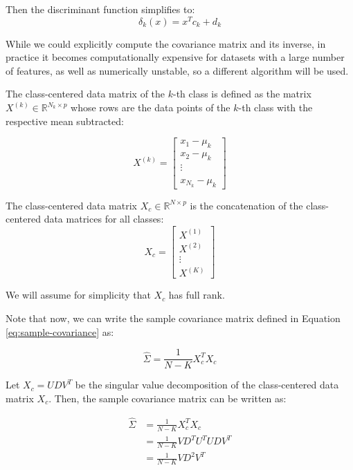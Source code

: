 Then the discriminant function simplifies to:
\[
\delta_k(x) = x^T c_k + d_k
\]

While we could explicitly compute the covariance matrix and its inverse, in practice it becomes computationally expensive for datasets with a large number of features, as well as numerically unstable, so a different algorithm will be used.

\begin{definition}
The class-centered data matrix of the $k$-th class is defined as the matrix $X^{(k)} \in \mathbb{R}^{N_{k} \times p}$ whose rows are the data points of the $k$-th class with the respective mean subtracted:

$$
X^{(k)} = \begin{bmatrix}
x_{1} - \mu_{k} \\
x_{2} - \mu_{k}  \\
\vdots \\  \\
x_{N_{k}} - \mu_{k}
\end{bmatrix}
$$
\end{definition}

\begin{definition}
The class-centered data matrix $X_c \in \mathbb{R}^{N \times p}$ is the concatenation of the class-centered data matrices for all classes:
\[
X_c = \begin{bmatrix}
X^{(1)} \\ X^{(2)} \\ \vdots \\ X^{(K)}
\end{bmatrix}
\]
\end{definition}

We will assume for simplicity that $X_c$ has full rank.

Note that now, we can write the sample covariance matrix defined in Equation \ref{eq:sample-covariance} as:

\[
\hat{\Sigma} = \frac{1}{N - K} X_c^T X_c
\]

Let $X_c = U D V^T$ be the singular value decomposition of the class-centered data matrix $X_c$. Then, the sample covariance matrix can be written as:

\begin{align*}
\hat{\Sigma} &= \frac{1}{N - K} X_{c}^{T} X_{c}  \\
&= \frac{1}{N - K} VD^{T}U^{T}UDV^{T} \\
&= \frac{1}{N - K} VD^{2}V^{T} \\
\end{align*}


